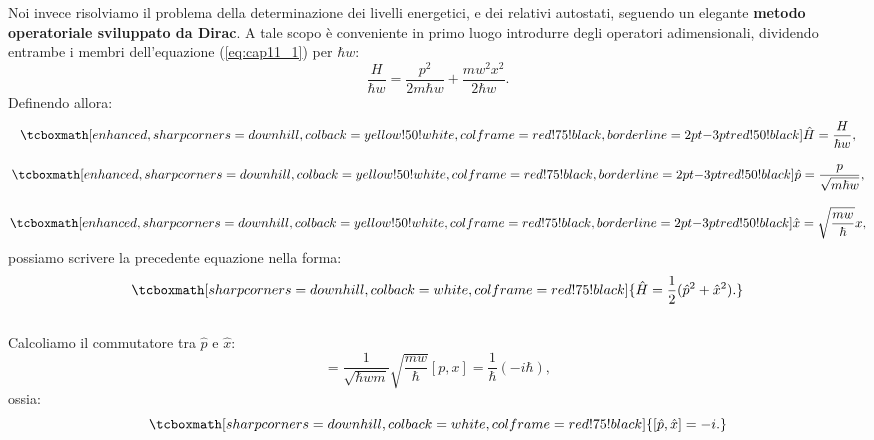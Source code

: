 Noi invece risolviamo il problema della determinazione dei livelli energetici, e dei relativi autostati, seguendo un elegante \textbf{metodo operatoriale sviluppato da Dirac}. A tale scopo è conveniente in primo luogo introdurre degli operatori adimensionali, dividendo entrambe i membri dell'equazione (\ref{eq:cap11_1}) per $\hbar w$:
	\begin{equation} \label{eq:cap11_2}
		\frac{H}{\hbar w}=\frac{p^2}{2m\hbar w}+\frac{mw^2x^2}{2\hbar w}.
	\end{equation}
Definendo allora:
	\begin{gather}  
		\tcboxmath[enhanced, sharp corners=downhill, colback=yellow!50!white, colframe=red!75!black, borderline={2pt}{-3pt}{red!50!black}]{	
			\hat{H}=\frac{H}{\hbar w},
			}  \\[0.3cm]
		\tcboxmath[enhanced, sharp corners=downhill, colback=yellow!50!white, colframe=red!75!black, borderline={2pt}{-3pt}{red!50!black}]{
			 \hat{p}=\frac{p}{\sqrt{m \hbar w }},
			}  \\[0.3cm]
		\tcboxmath[enhanced, sharp corners=downhill, colback=yellow!50!white, colframe=red!75!black, borderline={2pt}{-3pt}{red!50!black}]{
			 \hat{x}= \sqrt{\frac{mw}{\hbar}}x,
			}
	\end{gather}
possiamo scrivere la precedente equazione nella forma:
	\begin{equation}
		\tcboxmath[sharp corners=downhill, colback=white, colframe=red!75!black]{
			\hat{H}=\frac{1}{2} (\hat{p}^2+\hat{x}^2).
			}
	\end{equation}\\
	 
Calcoliamo il commutatore tra $\hat{p}$ e $\hat{x}$:
	\begin{equation}
		[\hat{p},\hat{x}]= \frac{1}{\sqrt{\hbar w m}} \sqrt{\frac{mw}{\hbar}} [p,x]=\frac{1}{\hbar}(-i\hbar),
	\end{equation}
ossia:
	\begin{equation}
	\label{eq:cap11_3}
	 	\tcboxmath[sharp corners=downhill, colback=white, colframe=red!75!black]{
			[\hat{p},\hat{x}]=-i.
			}
	\end{equation}\\
	
